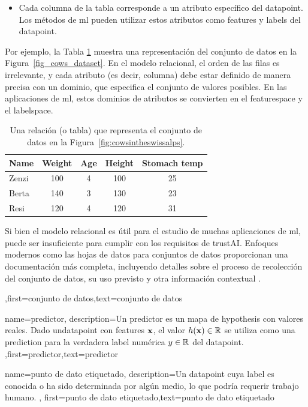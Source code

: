 {{\begin{itemize}
		\item Cada columna de la tabla corresponde a un atributo específico del \gls{datapoint}. 
		Los métodos de \gls{ml}  pueden utilizar estos atributos como \gls{feature}s y \gls{label}s del \gls{datapoint}.
		\end{itemize}
		Por ejemplo, la Tabla \ref{tab:cowdata} muestra una representación del conjunto de datos en la Figura\ \ref{fig_cows_dataset}. 
		En el modelo relacional, el orden de las filas es irrelevante, y cada atributo (es decir, columna) debe estar definido de manera precisa con un dominio, que especifica el conjunto de valores posibles.
		En las aplicaciones de \gls{ml}, estos dominios de atributos se convierten en el \gls{featurespace} y el \gls{labelspace}. 
		\begin{table}[H]
			\centering
			\begin{tabular}{lcccc}
				\hline
				\textbf{Name} & \textbf{Weight} & \textbf{Age} & \textbf{Height} & \textbf{Stomach temp} \\
				\hline
				Zenzi & 100 & 4 & 100 & 25 \\
				Berta & 140 & 3 & 130 & 23 \\
				Resi  & 120 & 4 & 120 & 31 \\
				\hline
			\end{tabular}
			\caption{Una relación (o tabla) que representa el conjunto de datos en la Figura\ \ref{fig:cowsintheswissalps}.}
			\label{tab:cowdata}
		\end{table}
 Si bien el modelo relacional es útil para el estudio de muchas aplicaciones de  \gls{ml}, puede ser insuficiente 
 para cumplir con los requisitos de  \gls{trustAI}. Enfoques modernos como las hojas de datos para conjuntos de datos proporcionan una documentación más completa,   
 incluyendo detalles sobre el proceso de recolección del conjunto de datos, su uso previsto y otra información contextual 
 \cite{DatasheetData2021}.},first={conjunto de datos},text={conjunto de datos}  
}

{name={predictor},
	description={Un predictor es un mapa de \gls{hypothesis} con valores reales.
		Dado un\gls{datapoint} con \gls{feature}s ${\bf x}$, el valor 
		$h({\bf x}) \in \mathbb{R}$ se utiliza como una \gls{prediction} para la verdadera  
		\gls{label} numérica $y \in \mathbb{R}$ del \gls{datapoint}. },first={predictor},text={predictor}  
}

{name={punto de dato etiquetado},
 description={Un \gls{datapoint} cuya \gls{label} es conocida o ha sido determinada  
 por algún medio, lo que podría requerir trabajo humano.
 },
 first={punto de dato etiquetado},text={punto de dato etiquetado}  
}

